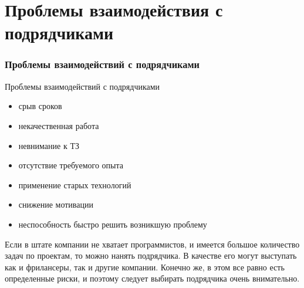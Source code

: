 \documentclass{../industrial-development}
\begin{document}
\section{Проблемы взаимодействия с подрядчиками}
\begin{frame} \frametitle{Проблемы взаимодействий с подрядчиками}
  \begin{block}{Проблемы взаимодействий с подрядчиками}
  \end{block}

\begin{itemize}
 \item срыв сроков 
 \item некачественная работа
 \item невнимание к ТЗ
 \item отсутствие требуемого опыта
 \item применение старых технологий
 \item снижение мотивации
 \item неспособность быстро решить возникшую проблему
  \end{itemize}
\end{frame}

\lecturenotes
Если в штате компании не хватает программистов, и имеется большое количество задач по проектам, то можно нанять подрядчика. В качестве его могут выступать как и фрилансеры, так и другие компании. Конечно же, в этом все равно есть определенные риски, и поэтому следует выбирать подрядчика очень внимательно. 

\begin{thebibliography}{99}
\end{thebibliography}
\end{document}
